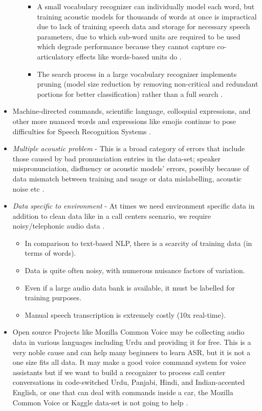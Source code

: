 \begin{itemize}
\begin{itemize}
\begin{itemize}
            \item A small vocabulary recognizer can individually model each word, but training acoustic models for thousands of words at once is impractical due to lack of training speech data and storage for necessary speech parameters, due to which sub-word units are required to be used which degrade performance because they cannot capture co-articulatory effects like words-based units do \cite{backstrom_introduction_2022}. 
            \item The search process in a large vocabulary recognizer implements pruning (model size reduction by removing non-critical and redundant portions for better classification) rather than a full search \cite{backstrom_introduction_2022}.
        \end{itemize}               
    \end{itemize}    
    \item Machine-directed commands, scientific language, colloquial expressions, and other more nuanced words and expressions like emojis continue to pose difficulties for Speech Recognition Systems \cite{jurafsky_speech_2009}. 
    \item \textit{Multiple acoustic problem} - This is a broad category of errors that include those caused by bad pronunciation entries in the data-set; speaker mispronunciation, disfluency or acoustic models' errors, possibly because of data mismatch between training and usage or data mislabelling, acoustic noise etc \cite{backstrom_introduction_2022}.
    \item \textit{Data specific to environment} - At times we need environment specific data in addition to clean data like in a call centers scenario, we require noisy/telephonic audio data \cite{shrawankar_adverse_2013, schuller_recognition_2009}. 
    \begin{itemize}
        \item In comparison to text-based NLP, there is a scarcity of training data (in terms of words). 
        \item Data is quite often noisy, with numerous nuisance factors of variation. 
        \item Even if a large audio data bank is available, it must be labelled for training purposes. 
        \item Manual speech transcription is extremely costly (10x real-time). 
    \end{itemize}
    \item Open source Projects like Mozilla Common Voice may be collecting audio data in various languages including Urdu and providing it for free. This is a very noble cause and can help many beginners to learn ASR, but it is not a one size fits all data. It may make a good voice command system for voice assistants but if we want to build a recognizer to process call center conversations in code-switched Urdu, Panjabi, Hindi, and Indian-accented English, or one that can deal with commands inside a car, the Mozilla Common Voice or Kaggle data-set is not going to help \cite{kincaid_state_2018}.

\end{itemize}
